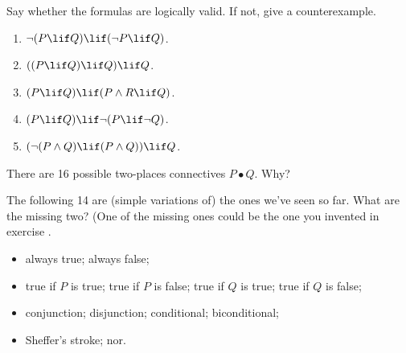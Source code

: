 \documentclass[../../../include/open-logic-section]{subfiles}
\begin{document}
\begin{prob}
Say whether the formulas are logically valid. If not, give a counterexample.
\begin{enumerate}
\item $\lnot(P\lif Q)\lif(\lnot P\lif Q)$.
\item $((P\lif Q)\lif Q)\lif Q$.
\item $(P\lif Q)\lif(P\land R\lif Q)$. 
\item $(P\lif Q)\lif\lnot(P\lif\lnot Q)$.
\item $(\lnot(P\land Q)\lif(P\land Q))\lif Q$.
\end{enumerate}
\end{prob}

\begin{prob}
There are 16 possible two-places connectives $P\bullet Q$. Why?

The following 14 are (simple variations of) the ones we've seen so
far. What are the missing two? (One of the missing ones could be the
one you invented in exercise .
\begin{itemize}
\item always true; always false;
\item true if $P$ is true; true if $P$ is false; true if $Q$ is true;
true if $Q$ is false;
\item conjunction; disjunction; conditional; biconditional;
\item Sheffer's stroke; nor.
\end{itemize}
\end{prob}
\end{document}

